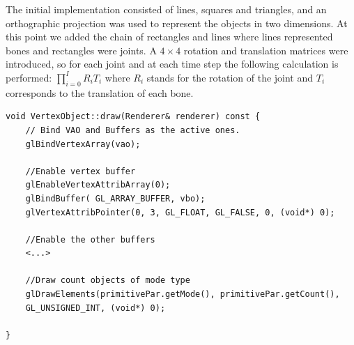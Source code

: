 \documentclass[paper=a4, fontsize=11pt]{scrartcl} %
\numberwithin{equation}{section} %
\numberwithin{figure}{section} %
\numberwithin{table}{section} %
\begin{document}
The initial implementation consisted of lines, squares and triangles, and an orthographic projection was used to represent the objects in two dimensions. 
At this point we added the chain of rectangles and lines where lines represented bones and rectangles were joints. A \(4 \times 4\) rotation and translation matrices were introduced, so for each joint and at each time step the following calculation is performed:  \(\prod_{i=0}^I R_i T_i\) where \(R_i\) stands for the rotation of the joint and \(T_i\) corresponds to the translation of each bone. \\

%


\begin{lstlisting}[float,caption=Common draw call for all VertexObjects., label={lst:draw}]
void VertexObject::draw(Renderer& renderer) const {
	// Bind VAO and Buffers as the active ones.
	glBindVertexArray(vao);

	//Enable vertex buffer
	glEnableVertexAttribArray(0);
	glBindBuffer( GL_ARRAY_BUFFER, vbo);
	glVertexAttribPointer(0, 3, GL_FLOAT, GL_FALSE, 0, (void*) 0);
	
	//Enable the other buffers 
	<...>
		
	//Draw count objects of mode type
	glDrawElements(primitivePar.getMode(), primitivePar.getCount(),
	GL_UNSIGNED_INT, (void*) 0);
	
}
\end{lstlisting}
\end{document}
